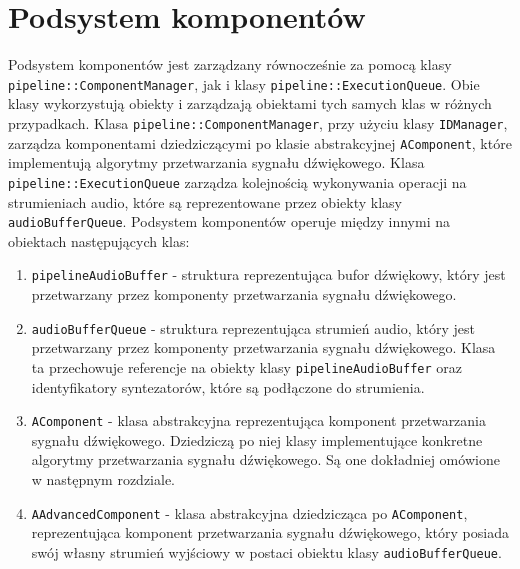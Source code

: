 \section{Podsystem komponentów}
Podsystem komponentów jest zarządzany równocześnie za pomocą klasy \texttt{pipeline::ComponentManager}, jak i klasy \texttt{pipeline::ExecutionQueue}. Obie klasy wykorzystują obiekty i zarządzają obiektami tych samych klas w różnych przypadkach. Klasa \texttt{pipeline::ComponentManager}, przy użyciu klasy \texttt{IDManager}, zarządza komponentami dziedziczącymi po klasie abstrakcyjnej \texttt{AComponent}, które implementują algorytmy przetwarzania sygnału dźwiękowego. Klasa \texttt{pipeline::ExecutionQueue} zarządza kolejnością wykonywania operacji na strumieniach audio, które są reprezentowane przez obiekty klasy \texttt{audioBufferQueue}. Podsystem komponentów operuje między innymi na obiektach następujących klas:
\begin{enumerate}
    \item \texttt{pipelineAudioBuffer} - struktura reprezentująca bufor dźwiękowy, który jest przetwarzany przez komponenty przetwarzania sygnału dźwiękowego.
    \item \texttt{audioBufferQueue} - struktura reprezentująca strumień audio, który jest przetwarzany przez komponenty przetwarzania sygnału dźwiękowego. Klasa ta przechowuje referencje na obiekty klasy \texttt{pipelineAudioBuffer} oraz identyfikatory syntezatorów, które są podłączone do strumienia.
    \item \texttt{AComponent} - klasa abstrakcyjna reprezentująca komponent przetwarzania sygnału dźwiękowego. Dziedziczą po niej klasy implementujące konkretne algorytmy przetwarzania sygnału dźwiękowego. Są one dokładniej omówione w następnym rozdziale.
    \item \texttt{AAdvancedComponent} - klasa abstrakcyjna dziedzicząca po \texttt{AComponent}, reprezentująca komponent przetwarzania sygnału dźwiękowego, który posiada swój własny strumień wyjściowy w postaci obiektu klasy \texttt{audioBufferQueue}. 
\end{enumerate}

